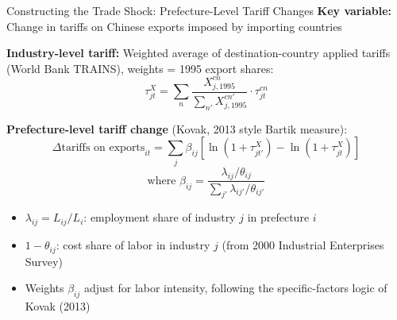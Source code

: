 \documentclass[10pt,aspectratio=169,t]{beamer}
\begin{document}
\begin{frame}{Constructing the Trade Shock: Prefecture-Level Tariff Changes}
\textbf{Key variable:} Change in tariffs on Chinese exports imposed by importing countries

\bigskip
\textbf{Industry-level tariff:} Weighted average of destination-country applied tariffs (World Bank TRAINS), weights = 1995 export shares:
$$\tau_{jt}^{X} = \sum_{n} \frac{X_{j,1995}^{cn}}{\sum_{n'} X_{j,1995}^{cn'}} \cdot \tau_{jt}^{cn}$$

\bigskip
\textbf{Prefecture-level tariff change} (Kovak, 2013 style Bartik measure):
$$\Delta \text{tariffs on exports}_{it} = \sum_{j} \beta_{ij}\left[\ln(1+\tau_{jt'}^X) - \ln(1+\tau_{jt}^X)\right]$$
\vspace{-6pt}
$$\text{where } \beta_{ij} = \frac{\lambda_{ij} / \theta_{ij}}{\sum_{j'}\lambda_{ij'}/\theta_{ij'}}$$

\begin{itemize}
    \item $\lambda_{ij} = L_{ij}/L_i$: employment share of industry $j$ in prefecture $i$
    \item $1-\theta_{ij}$: cost share of labor in industry $j$ (from 2000 Industrial Enterprises Survey)
    \item Weights $\beta_{ij}$ adjust for labor intensity, following the specific-factors logic of Kovak (2013)
\end{itemize}
\end{frame}
\end{document}

